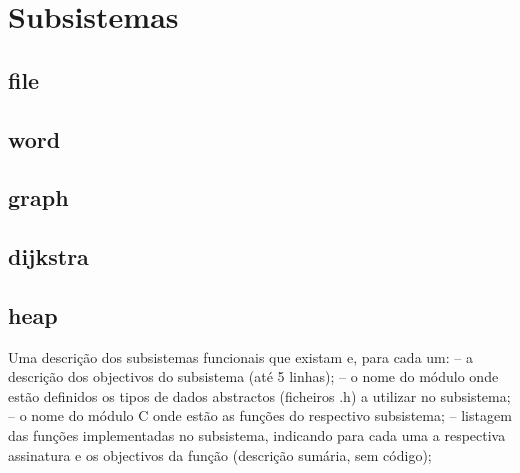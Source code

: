 \documentclass[a4paper, 18pt]{article}
\begin{document}
\section{Subsistemas}
	\subsection{file}
	\subsection{word}
	\subsection{graph}
	\subsection{dijkstra}
	\subsection{heap}

	\par
	Uma descrição dos subsistemas funcionais que existam e, para cada um:
	– a descrição dos objectivos do subsistema (até 5 linhas);
	– o nome do módulo onde estão definidos os tipos de dados abstractos
	  (ficheiros .h) a utilizar no subsistema;
	– o nome do módulo C onde estão as funções do respectivo subsistema;
	– listagem das funções implementadas no subsistema, indicando para cada uma a
	  respectiva assinatura e os objectivos da função (descrição sumária, sem código);
\end{document}
